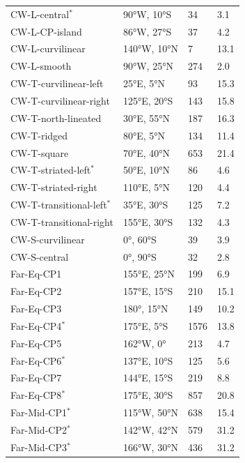 \documentclass[preprint,11pt,3p,times,authoryear]{elsarticle}
\begin{document}
\begin{table}[ht!]
\centering
  \begin{tabular}{p{4.0cm} p{3.0cm} p{2.0cm} p{3.0cm}}
\hline
\hline
  CW-L-central$^{*}$ & 90°W, 10°S & 34 & 3.1 \\
  CW-L-CP-island & 86°W, 27°S  & 37 & 4.2 \\ %
  CW-L-curvilinear &  140°W, 10°N & 7 &  13.1 \\
  CW-L-smooth &  90°W, 25°N & 274 &  2.0 \\
  CW-T-curvilinear-left & 25°E, 5°N & 93 &  15.3\\
  CW-T-curvilinear-right & 125°E, 20°S & 143 &  15.8\\
  CW-T-north-lineated & 30°E, 55°N & 187 &  16.3\\
  CW-T-ridged & 80°E, 5°N & 134 &  11.4 \\
  CW-T-square & 70°E, 40°N & 653 &  21.4 \\
  CW-T-striated-left$^{*}$ & 50°E, 10°N & 86 & 4.6 \\
  CW-T-striated-right & 110°E, 5°N & 120 & 4.4 \\
  CW-T-transitional-left$^{*}$ & 35°E, 30°S & 125 & 7.2 \\
  CW-T-transitional-right & 155°E, 30°S & 132 &  4.3 \\
  CW-S-curvilinear & 0°, 60°S & 39 &  3.9 \\
  CW-S-central & 0°, 90°S & 32 &  2.8 \\
  Far-Eq-CP1 & 155°E, 25°N & 199 &  6.9 \\
  Far-Eq-CP2 & 157°E, 15°S & 210 &  15.1 \\
  Far-Eq-CP3 & 180°, 15°N & 149 &  10.2\\
  Far-Eq-CP4$^{*}$ & 175°E, 5°S & 1576 & 13.8 \\
  Far-Eq-CP5 & 162°W, 0° & 213 &  4.7 \\
  Far-Eq-CP6$^{*}$ & 137°E, 10°S & 125 & 5.6 \\
  Far-Eq-CP7 & 144°E, 15°S & 219 &  8.8 \\
  Far-Eq-CP8$^{*}$ & 175°E, 30°S & 857 & 20.8\\
  Far-Mid-CP1$^{*}$ & 115°W, 50°N & 638 & 15.4 \\
  Far-Mid-CP2$^{*}$ & 142°W, 42°N & 579 & 31.2 \\
  Far-Mid-CP3$^{*}$ & 166°W, 30°N & 436 & 31.2\\

\end{tabular}
\end{table}
\end{document}
